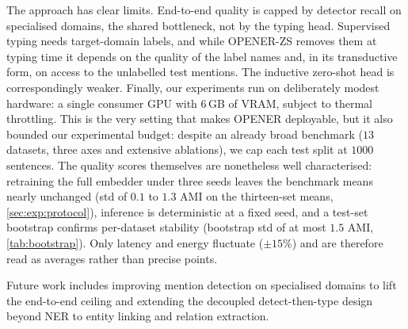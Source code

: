 The approach has clear limits.
End-to-end quality is capped by detector recall on specialised domains, the shared bottleneck, not by the typing head.
Supervised typing needs target-domain labels, and while OPENER-ZS removes them at typing time it depends on the quality of the label names and, in its transductive form, on access to the unlabelled test mentions. The inductive zero-shot head is correspondingly weaker.
Finally, our experiments run on deliberately modest hardware: a single consumer GPU with $6$\,GB of VRAM, subject to thermal throttling.
This is the very setting that makes OPENER deployable, but it also bounded our experimental budget: despite an already broad benchmark ($13$ datasets, three axes and extensive ablations), we cap each test split at $1000$ sentences.
The quality scores themselves are nonetheless well characterised: retraining the full embedder under three seeds leaves the benchmark means nearly unchanged (std of $0.1$ to $1.3$ AMI on the thirteen-set means, \autoref{sec:exp:protocol}), inference is deterministic at a fixed seed, and a test-set bootstrap confirms per-dataset stability (bootstrap std of at most $1.5$ AMI, \autoref{tab:bootstrap}). Only latency and energy fluctuate ($\pm 15\%$) and are therefore read as averages rather than precise points.

Future work includes improving mention detection on specialised domains to lift the end-to-end ceiling and extending the decoupled detect-then-type design beyond NER to entity linking and relation extraction.
